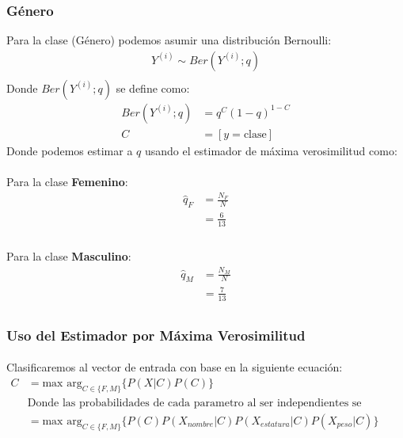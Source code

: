 \documentclass[12pt]{article}
\begin{document}
  \subsubsection{Género}
  Para la clase (Género) podemos asumir una distribución Bernoulli:
  \begin{equation}
  \begin{split}
  Y^{(i)}\sim Ber(Y^{(i)};q)\\
  \end{split}
  \end{equation}
  Donde $Ber(Y^{(i)};q)$ se define como:\\
  \begin{equation}
  	\begin{split}
  		Ber(Y^{(i)};q)&= q^C(1 - q)^{1-C}\\
  		C &= [y = \text{clase}]
  	\end{split}
  \end{equation}
 Donde podemos estimar a $q$ usando el estimador de máxima verosimilitud como:\\
 \paragraph{}Para la clase \textbf{Femenino}:
 \begin{equation}
 	\begin{split}
 		\hat{q}_F &= \frac{N_F}{N}\\
 		&= \frac{6}{13}\\
 	\end{split}
 \end{equation}
 \paragraph{}Para la clase \textbf{Masculino}:
 \begin{equation}
 \begin{split}
 \hat{q}_M &= \frac{N_M}{N}\\
 &= \frac{7}{13}\\
 \end{split}
 \end{equation}
 \clearpage
 \pagebreak
 \subsubsection{Uso del Estimador por Máxima Verosimilitud}
 \paragraph{} Clasificaremos al vector de entrada con base en la siguiente ecuación:
 \begin{equation}
 	\begin{split}
 		C &= \text{max arg}_{C\in\{F,M\}} \{ P(X|C)P(C)\} \\
 		&\text{Donde las probabilidades de cada parametro al ser independientes se multiplicaran}\\
 		&= \text{max arg}_{C\in\{F,M\}} \{ P(C) P(X_{nombre}|C)P(X_{estatura}|C)P(X_{peso}|C)\}
 	\end{split}
 \end{equation}
\end{document}
